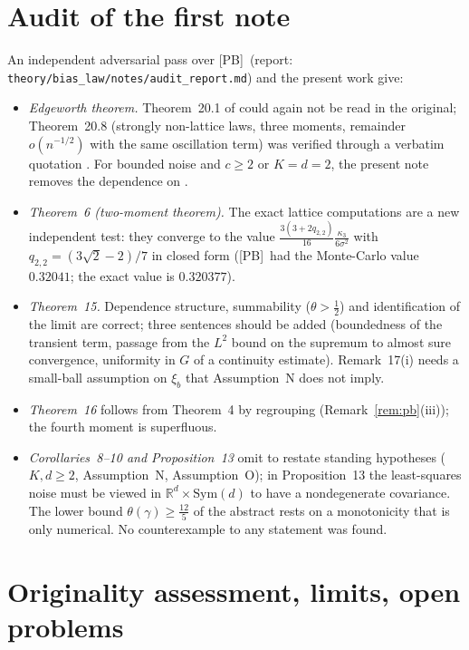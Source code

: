 \documentclass[10pt]{article}
\theoremstyle{definition}
\theoremstyle{remark}
\newcommand{\R}{\mathbb{R}}
\newcommand{\PB}{\textup{[PB]}}
\begin{document}
\section{Audit of the first note}\label{sec:audit}

An independent adversarial pass over \PB\ (report: \texttt{theory/bias\_law/notes/audit\_report.md}) and the present work give:
\begin{itemize}[itemsep=1pt,topsep=2pt]
\item \emph{Edgeworth theorem.} Theorem~20.1 of \cite{br} could again not be read in the original; Theorem~20.8 (strongly
non-lattice laws, three moments, remainder $o(n^{-1/2})$ with the same oscillation term) was verified through a verbatim
quotation \cite{honda}. For bounded noise and $c\ge2$ or $K=d=2$, the present note removes the dependence on \cite{br}.
\item \emph{Theorem~6 (two-moment theorem).} The exact lattice computations are a new independent test: they converge
to the value $\frac{3(3+2q_{2,2})}{16}\frac{\kappa_3}{6\sigma^2}$ with $q_{2,2}=(3\sqrt2-2)/7$ in closed form (\PB\ had the
Monte-Carlo value $0.32041$; the exact value is $0.320377$).
\item \emph{Theorem~15.} Dependence structure, summability ($\theta>\frac12$) and identification of the limit are
correct; three sentences should be added (boundedness of the transient term, passage from the $L^2$ bound on the
supremum to almost sure convergence, uniformity in $G$ of a continuity estimate). Remark~17(i) needs a small-ball
assumption on $\xi_b$ that Assumption~N does not imply.
\item \emph{Theorem~16} follows from Theorem~4 by regrouping (Remark~\ref{rem:pb}(iii)); the fourth moment is superfluous.
\item \emph{Corollaries~8--10 and Proposition~13} omit to restate standing hypotheses ($K,d\ge2$, Assumption~N,
Assumption~O); in Proposition~13 the least-squares noise must be viewed in $\R^d\times\mathrm{Sym}(d)$ to have a
nondegenerate covariance. The lower bound $\theta(\gamma)\ge\frac{12}5$ of the abstract rests on a monotonicity that is
only numerical. No counterexample to any statement was found.
\end{itemize}

\section{Originality assessment, limits, open problems}\label{sec:ledger}
\end{document}
